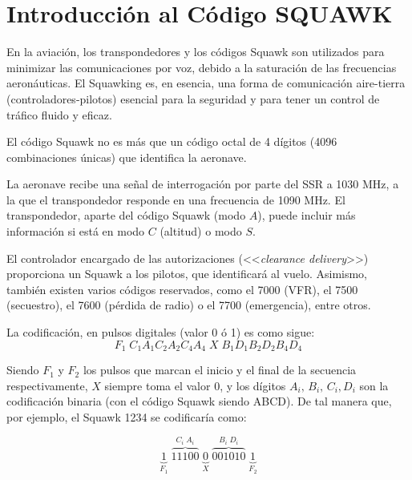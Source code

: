 \section*{Introducción al Código SQUAWK}
En la aviación, los transpondedores y los códigos Squawk son utilizados para minimizar las comunicaciones por voz, debido a la saturación de las frecuencias aeronáuticas. El Squawking es, en esencia, una forma de comunicación aire-tierra (controladores-pilotos) esencial para la seguridad y para tener un control de tráfico fluido y eficaz.

El código Squawk no es más que un código octal de 4 dígitos (4096 combinaciones únicas) que identifica la aeronave. 

La aeronave recibe una señal de interrogación por parte del SSR a 1030 MHz, a la que el transpondedor responde en una frecuencia de 1090 MHz. El transpondedor, aparte del código Squawk (modo $A$), puede incluir más información si está en modo $C$ (altitud) o modo $S$.

El controlador encargado de las autorizaciones (<<\textit{clearance delivery}>>) proporciona un Squawk a los pilotos, que identificará al vuelo. Asimismo, también existen varios códigos reservados, como el 7000 (VFR), el 7500 (secuestro), el 7600 (pérdida de radio) o el 7700 (emergencia), entre otros.

La codificación, en pulsos digitales (valor 0 ó 1) es como sigue:
\begin{equation*}
    F_1 \; C_1 A_1 C_2 A_2C_4 A_4 \; X \; B_1D_1B_2D_2B_4D_4
\end{equation*}

Siendo $F_1$ y $F_2$ los pulsos que marcan el inicio y el final de la secuencia respectivamente, $X$ siempre toma el valor 0, y los dígitos $A_i, \, B_i,\, C_i, D_i$ son la codificación binaria (con el código Squawk siendo ABCD). De tal manera que, por ejemplo, el Squawk 1234 se codificaría como:

\begin{equation*}
    \underbrace{1}_{F_1} \; \overbrace{ 1 1 1 0 0}^{C_i \; A_i} \; \underbrace{0}_X\; \overbrace{0 0 1 0 1 0}^{B_i \; D_i} \; \underbrace{1}_{F_2}
\end{equation*}


